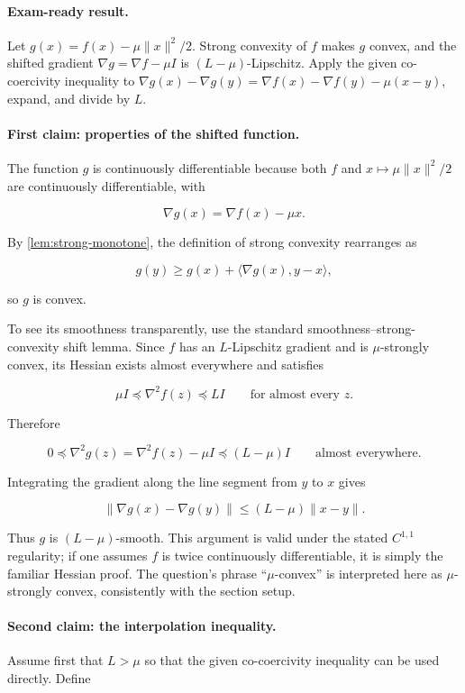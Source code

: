 \documentclass[11pt,a4paper]{article}
\theoremstyle{definition}
\begin{document}
\paragraph{Exam-ready result.}
Let $g(x)=f(x)-\mu\|x\|^2/2$. Strong convexity of $f$ makes $g$ convex, and the shifted gradient $\nabla g=\nabla f-\mu I$ is $(L-\mu)$-Lipschitz. Apply the given co-coercivity inequality to $\nabla g(x)-\nabla g(y)=\nabla f(x)-\nabla f(y)-\mu(x-y)$, expand, and divide by $L$.

\paragraph{First claim: properties of the shifted function.}
The function $g$ is continuously differentiable because both $f$ and $x\mapsto\mu\|x\|^2/2$ are continuously differentiable, with

\[
\nabla g(x)=\nabla f(x)-\mu x.
\]

By \cref{lem:strong-monotone}, the definition of strong convexity rearranges as

\[
g(y)\geq g(x)+\langle\nabla g(x),y-x\rangle,
\]

so $g$ is convex.

To see its smoothness transparently, use the standard smoothness--strong-convexity shift lemma. Since $f$ has an $L$-Lipschitz gradient and is $\mu$-strongly convex, its Hessian exists almost everywhere and satisfies

\[
\mu I\preceq \nabla^2 f(z)\preceq LI
\qquad\text{for almost every }z.
\]

Therefore

\[
0\preceq\nabla^2g(z)=\nabla^2f(z)-\mu I\preceq(L-\mu)I
\qquad\text{almost everywhere}.
\]

Integrating the gradient along the line segment from $y$ to $x$ gives

\[
\|\nabla g(x)-\nabla g(y)\|
\leq(L-\mu)\|x-y\|.
\]

Thus $g$ is $(L-\mu)$-smooth. This argument is valid under the stated $C^{1,1}$ regularity; if one assumes $f$ is twice continuously differentiable, it is simply the familiar Hessian proof. The question's phrase ``$\mu$-convex'' is interpreted here as $\mu$-strongly convex, consistently with the section setup.

\paragraph{Second claim: the interpolation inequality.}
Assume first that $L>\mu$ so that the given co-coercivity inequality can be used directly. Define
\end{document}
